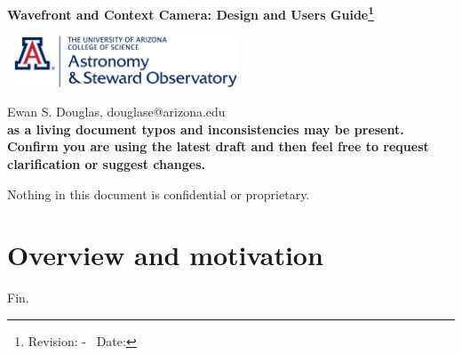 \documentclass[12pt]{book}
\begin{document}
\begin{titlepage}
\begin{center}

\vspace*{\fill}
{\large \bfseries Wavefront and Context Camera: Design and Users Guide\footnote{{ Revision: \gitAbbrevHash - \gitDirty\ Date: \gitCommitterDate}}}
\vspace*{20cm}
\end{center}


\end{titlepage}
\newpage
\begin{center}

\vspace{7cm }
\
\includegraphics[width=0.5\textwidth]{images/steward_logo.png}
\vspace{2cm }

Ewan S. Douglas, douglase@arizona.edu\\

\textbf{as a living document typos and inconsistencies may be present. Confirm you are using the latest draft and then feel free to request clarification or suggest changes.}

Nothing in this document is confidential or proprietary.


\end{center}


\tableofcontents

\linenumbers

\chapter{Overview and motivation}
\printglossary[type=main,nonumberlist]


\sloppy %



Fin.
\end{document}
